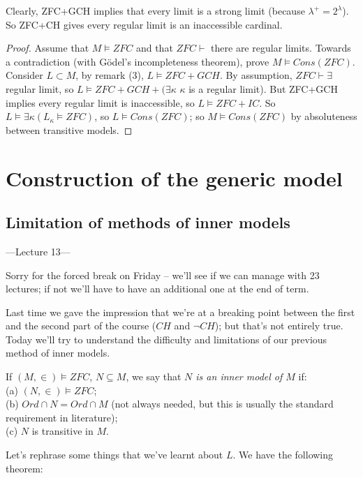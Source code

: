 \documentclass[a4paper]{article}
\begin{document}
Clearly, ZFC+GCH implies that every limit is a strong limit (because $\lambda^+ = 2^\lambda$). So ZFC+CH gives every regular limit is an inaccessible cardinal.
\begin{proof}
Assume that $M \vDash ZFC$ and that $ZFC\vdash$ there are regular limits. Towards a contradiction (with G\"{o}del's incompleteness theorem), prove $M \vDash Cons(ZFC)$.\\
Consider $L \subset M$, by remark (3), $L \vDash ZFC+GCH$. By assumption, $ZFC \vdash \exists$ regular limit, so $L \vDash ZFC+GCH+(\exists \kappa$ $\kappa$ is a regular limit). But ZFC+GCH implies every regular limit is inaccessible, so $L \vDash ZFC+IC$. So $L \vDash \exists \kappa (L_\kappa \vDash ZFC)$, so $L \vDash Cons(ZFC)$; so $M \vDash Cons(ZFC)$ by absoluteness between transitive models.
\end{proof}

\newpage

\section{Construction of the generic model}

\subsection{Limitation of methods of inner models}

---Lecture 13---

Sorry for the forced break on Friday -- we'll see if we can manage with 23 lectures; if not we'll have to have an additional one at the end of term.

Last time we gave the impression that we're at a breaking point between the first and the second part of the course ($CH$ and $\neg CH$); but that's not entirely true. Today we'll try to understand the difficulty and limitations of our previous method of inner models.

\begin{defi}
If $(M,\in) \vDash ZFC$, $N \subseteq M$, we say that \emph{$N$ is an inner model of $M$} if:\\
(a) $(N,\in) \vDash ZFC$;\\
(b) $Ord \cap N = Ord \cap M$ (not always needed, but this is usually the standard requirement in literature);\\
(c) $N$ is transitive in $M$.
\end{defi}

Let's rephrase some things that we've learnt about $L$. We have the following theorem:
\end{document}
